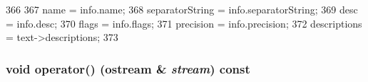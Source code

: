 \begin{DoxyCode}
366 {
367     name = info.name;
368     separatorString = info.separatorString;
369     desc = info.desc;
370     flags = info.flags;
371     precision = info.precision;
372     descriptions = text->descriptions;
373 }
\end{DoxyCode}
\hypertarget{structStats_1_1DistPrint_ab796867ec17c9aaf14b8e44923fc17e4}{
\subsubsection[{operator()}]{\setlength{\rightskip}{0pt plus 5cm}void operator() (ostream \& {\em stream}) const}}
\label{structStats_1_1DistPrint_ab796867ec17c9aaf14b8e44923fc17e4}



